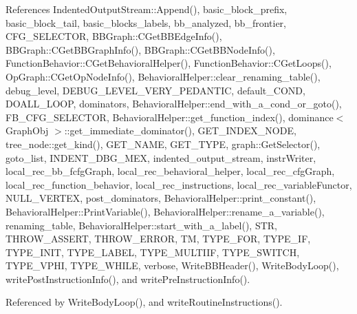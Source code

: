 References Indented\+Output\+Stream\+::\+Append(), basic\+\_\+block\+\_\+prefix, basic\+\_\+block\+\_\+tail, basic\+\_\+blocks\+\_\+labels, bb\+\_\+analyzed, bb\+\_\+frontier, C\+F\+G\+\_\+\+S\+E\+L\+E\+C\+T\+OR, B\+B\+Graph\+::\+C\+Get\+B\+B\+Edge\+Info(), B\+B\+Graph\+::\+C\+Get\+B\+B\+Graph\+Info(), B\+B\+Graph\+::\+C\+Get\+B\+B\+Node\+Info(), Function\+Behavior\+::\+C\+Get\+Behavioral\+Helper(), Function\+Behavior\+::\+C\+Get\+Loops(), Op\+Graph\+::\+C\+Get\+Op\+Node\+Info(), Behavioral\+Helper\+::clear\+\_\+renaming\+\_\+table(), debug\+\_\+level, D\+E\+B\+U\+G\+\_\+\+L\+E\+V\+E\+L\+\_\+\+V\+E\+R\+Y\+\_\+\+P\+E\+D\+A\+N\+T\+IC, default\+\_\+\+C\+O\+ND, D\+O\+A\+L\+L\+\_\+\+L\+O\+OP, dominators, Behavioral\+Helper\+::end\+\_\+with\+\_\+a\+\_\+cond\+\_\+or\+\_\+goto(), F\+B\+\_\+\+C\+F\+G\+\_\+\+S\+E\+L\+E\+C\+T\+OR, Behavioral\+Helper\+::get\+\_\+function\+\_\+index(), dominance$<$ Graph\+Obj $>$\+::get\+\_\+immediate\+\_\+dominator(), G\+E\+T\+\_\+\+I\+N\+D\+E\+X\+\_\+\+N\+O\+DE, tree\+\_\+node\+::get\+\_\+kind(), G\+E\+T\+\_\+\+N\+A\+ME, G\+E\+T\+\_\+\+T\+Y\+PE, graph\+::\+Get\+Selector(), goto\+\_\+list, I\+N\+D\+E\+N\+T\+\_\+\+D\+B\+G\+\_\+\+M\+EX, indented\+\_\+output\+\_\+stream, instr\+Writer, local\+\_\+rec\+\_\+bb\+\_\+fcfg\+Graph, local\+\_\+rec\+\_\+behavioral\+\_\+helper, local\+\_\+rec\+\_\+cfg\+Graph, local\+\_\+rec\+\_\+function\+\_\+behavior, local\+\_\+rec\+\_\+instructions, local\+\_\+rec\+\_\+variable\+Functor, N\+U\+L\+L\+\_\+\+V\+E\+R\+T\+EX, post\+\_\+dominators, Behavioral\+Helper\+::print\+\_\+constant(), Behavioral\+Helper\+::\+Print\+Variable(), Behavioral\+Helper\+::rename\+\_\+a\+\_\+variable(), renaming\+\_\+table, Behavioral\+Helper\+::start\+\_\+with\+\_\+a\+\_\+label(), S\+TR, T\+H\+R\+O\+W\+\_\+\+A\+S\+S\+E\+RT, T\+H\+R\+O\+W\+\_\+\+E\+R\+R\+OR, TM, T\+Y\+P\+E\+\_\+\+F\+OR, T\+Y\+P\+E\+\_\+\+IF, T\+Y\+P\+E\+\_\+\+I\+N\+IT, T\+Y\+P\+E\+\_\+\+L\+A\+B\+EL, T\+Y\+P\+E\+\_\+\+M\+U\+L\+T\+I\+IF, T\+Y\+P\+E\+\_\+\+S\+W\+I\+T\+CH, T\+Y\+P\+E\+\_\+\+V\+P\+HI, T\+Y\+P\+E\+\_\+\+W\+H\+I\+LE, verbose, Write\+B\+B\+Header(), Write\+Body\+Loop(), write\+Post\+Instruction\+Info(), and write\+Pre\+Instruction\+Info().



Referenced by Write\+Body\+Loop(), and write\+Routine\+Instructions().

